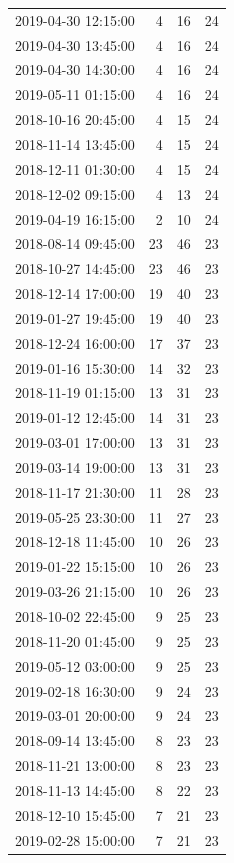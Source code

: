 \begin{tabular}{lrrr}
2019-04-30 12:15:00 & 4 & 16 & 24 \\
2019-04-30 13:45:00 & 4 & 16 & 24 \\
2019-04-30 14:30:00 & 4 & 16 & 24 \\
2019-05-11 01:15:00 & 4 & 16 & 24 \\
2018-10-16 20:45:00 & 4 & 15 & 24 \\
2018-11-14 13:45:00 & 4 & 15 & 24 \\
2018-12-11 01:30:00 & 4 & 15 & 24 \\
2018-12-02 09:15:00 & 4 & 13 & 24 \\
2019-04-19 16:15:00 & 2 & 10 & 24 \\
2018-08-14 09:45:00 & 23 & 46 & 23 \\
2018-10-27 14:45:00 & 23 & 46 & 23 \\
2018-12-14 17:00:00 & 19 & 40 & 23 \\
2019-01-27 19:45:00 & 19 & 40 & 23 \\
2018-12-24 16:00:00 & 17 & 37 & 23 \\
2019-01-16 15:30:00 & 14 & 32 & 23 \\
2018-11-19 01:15:00 & 13 & 31 & 23 \\
2019-01-12 12:45:00 & 14 & 31 & 23 \\
2019-03-01 17:00:00 & 13 & 31 & 23 \\
2019-03-14 19:00:00 & 13 & 31 & 23 \\
2018-11-17 21:30:00 & 11 & 28 & 23 \\
2019-05-25 23:30:00 & 11 & 27 & 23 \\
2018-12-18 11:45:00 & 10 & 26 & 23 \\
2019-01-22 15:15:00 & 10 & 26 & 23 \\
2019-03-26 21:15:00 & 10 & 26 & 23 \\
2018-10-02 22:45:00 & 9 & 25 & 23 \\
2018-11-20 01:45:00 & 9 & 25 & 23 \\
2019-05-12 03:00:00 & 9 & 25 & 23 \\
2019-02-18 16:30:00 & 9 & 24 & 23 \\
2019-03-01 20:00:00 & 9 & 24 & 23 \\
2018-09-14 13:45:00 & 8 & 23 & 23 \\
2018-11-21 13:00:00 & 8 & 23 & 23 \\
2018-11-13 14:45:00 & 8 & 22 & 23 \\
2018-12-10 15:45:00 & 7 & 21 & 23 \\
2019-02-28 15:00:00 & 7 & 21 & 23 \\

\end{tabular}
